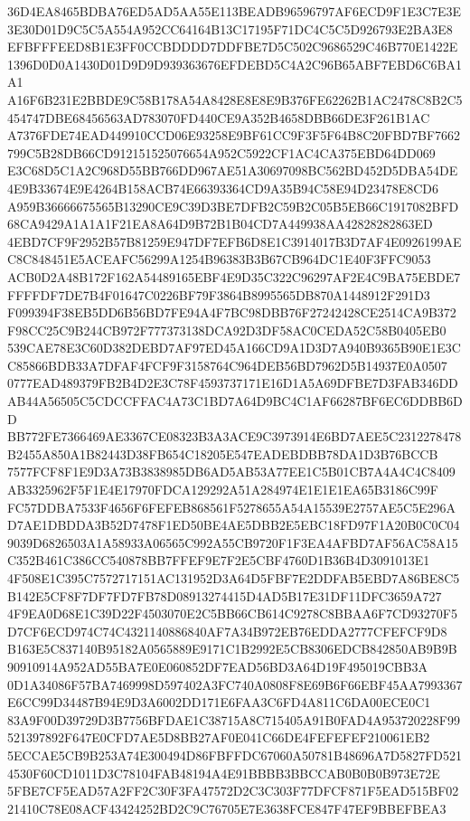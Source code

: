 \documentclass[UTF8,fontset=fandol,zihao=-4,a4paper]{ctexart}
\begin{document}
{{36D4EA8465BDBA76ED5AD5AA55E113BEADB96596797AF6ECD9F1E3C7E3E3E30D01D9C5C5A554A952CC64164B13C17195F71DC4C5C5D926793E2BA3E8
EFBFFFEED8B1E3FF0CCBDDDD7DDFBE7D5C502C9686529C46B770E1422E1396D0D0A1430D01D9D9D939363676EFDEBD5C4A2C96B65ABF7EBD6C6BA1A1
A16F6B231E2BBDE9C58B178A54A8428E8E8E9B376FE62262B1AC2478C8B2C5454747DBE68456563AD783070FD440CE9A352B4658DBB66DE3F261B1AC
A7376FDE74EAD449910CCD06E93258E9BF61CC9F3F5F64B8C20FBD7BF7662799C5B28DB66CD912151525076654A952C5922CF1AC4CA375EBD64DD069
E3C68D5C1A2C968D55BB766DD967AE51A30697098BC562BD452D5DBA54DE4E9B33674E9E4264B158ACB74E66393364CD9A35B94C58E94D23478E8CD6
A959B36666675565B13290CE9C39D3BE7DFB2C59B2C05B5EB66C1917082BFD68CA9429A1A1A1F21EA8A64D9B72B1B04CD7A449938AA42828282863ED
4EBD7CF9F2952B57B81259E947DF7EFB6D8E1C3914017B3D7AF4E0926199AEC8C848451E5ACEAFC56299A1254B96383B3B67CB964DC1E40F3FFC9053
ACB0D2A48B172F162A54489165EBF4E9D35C322C96297AF2E4C9BA75EBDE7FFFFDF7DE7B4F01647C0226BF79F3864B8995565DB870A1448912F291D3
F099394F38EB5DD6B56BD7FE94A4F7BC98DBB76F27242428CE2514CA9B372F98CC25C9B244CB972F777373138DCA92D3DF58AC0CEDA52C58B0405EB0
539CAE78E3C60D382DEBD7AF97ED45A166CD9A1D3D7A940B9365B90E1E3CC85866BDB33A7DFAF4FCF9F3158764C964DEB56BD7962D5B14937E0A0507
0777EAD489379FB2B4D2E3C78F4593737171E16D1A5A69DFBE7D3FAB346DDAB44A56505C5CDCCFFAC4A73C1BD7A64D9BC4C1AF66287BF6EC6DDBB6DD
BB772FE7366469AE3367CE08323B3A3ACE9C3973914E6BD7AEE5C2312278478B2455A850A1B82443D38FB654C18205E547EADEBDBB78DA1D3B76BCCB
7577FCF8F1E9D3A73B3838985DB6AD5AB53A77EE1C5B01CB7A4A4C4C8409AB3325962F5F1E4E17970FDCA129292A51A284974E1E1E1EA65B3186C99F
FC57DDBA7533F4656F6FEFEB868561F5278655A54A15539E2757AE5C5E296AD7AE1DBDDA3B52D7478F1ED50BE4AE5DBB2E5EBC18FD97F1A20B0C0C04
9039D6826503A1A58933A06565C992A55CB9720F1F3EA4AFBD7AF56AC58A15C352B461C386CC540878BB7FFEF9E7F2E5CBF4760D1B36B4D3091013E1
4F508E1C395C7572717151AC131952D3A64D5FBF7E2DDFAB5EBD7A86BE8C5B142E5CF8F7DF7FD7FB78D08913274415D4AD5B17E31DF11DFC3659A727
4F9EA0D68E1C39D22F4503070E2C5BB66CB614C9278C8BBAA6F7CD93270F5D7CF6ECD974C74C4321140886840AF7A34B972EB76EDDA2777CFEFCF9D8
B163E5C837140B95182A0565889E9171C1B2992E5CB8306EDCB842850AB9B9B90910914A952AD55BA7E0E060852DF7EAD56BD3A64D19F495019CBB3A
0D1A34086F57BA7469998D597402A3FC740A0808F8E69B6F66EBF45AA7993367E6CC99D34487B94E9D3A6002DD171E6FAA3C6FD4A811C6DA00ECE0C1
83A9F00D39729D3B7756BFDAE1C38715A8C715405A91B0FAD4A953720228F99521397892F647E0CFD7AE5D8BB27AF0E041C66DE4FEFEFEF210061EB2
5ECCAE5CB9B253A74E300494D86FBFFDC67060A50781B48696A7D5827FD5214530F60CD1011D3C78104FAB48194A4E91BBBB3BBCCAB0B0B0B973E72E
5FBE7CF5EAD57A2FF2C30F3FA47572D2C3C303F77DFCF871F5EAD515BF0221410C78E08ACF43424252BD2C9C76705E7E3638FCE847F47EF9BBEFBEA3
}}
\end{document}
